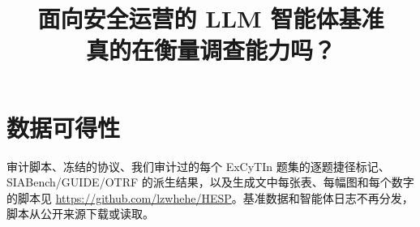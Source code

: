 \documentclass[conference,compsoc,a4paper]{IEEEtran}
\newcommand{\repourl}{\url{https://github.com/lzwhehe/HESP}}
\begin{document}
\title{面向安全运营的 LLM 智能体基准\\真的在衡量调查能力吗？}

\author{
\and
{}
}

\maketitle













\section*{数据可得性}
审计脚本、冻结的协议、我们审计过的每个 ExCyTIn 题集的逐题捷径标记、SIABench/GUIDE/OTRF 的派生结果，以及生成文中每张表、每幅图和每个数字的脚本见 \repourl{}。基准数据和智能体日志不再分发，脚本从公开来源下载或读取。

{\footnotesize

}

\appendices

\end{document}
